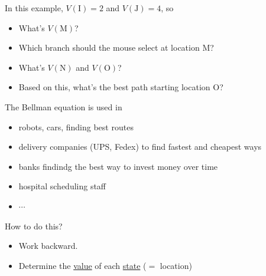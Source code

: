 \documentclass[a4paper, 12pt]{article}
\begin{document}
In this example, $V(\text{I}) = 2$ and $V(\text{J}) = 4$, so

\begin{itemize}
\item What's $V(\text{M})$?
\item Which branch should the mouse select at location M?
\item What's $V(\text{N})$ and $V(\text{O})$?
\item Based on this, what's the best path starting location O?
\end{itemize}

The Bellman equation is used in 
\begin{itemize}
\item robots, cars, finding best routes
\item delivery companies (UPS, Fedex) to find fastest and cheapest ways
\item banks findindg the best way to invest money over time
\item hospital scheduling staff
\item $\cdots$
\end{itemize}

How to do this?
\begin{itemize}
\item Work backward.
\item Determine the \underline{value} of each \underline{state} ($=$ location)
\end{itemize}
\end{document}
